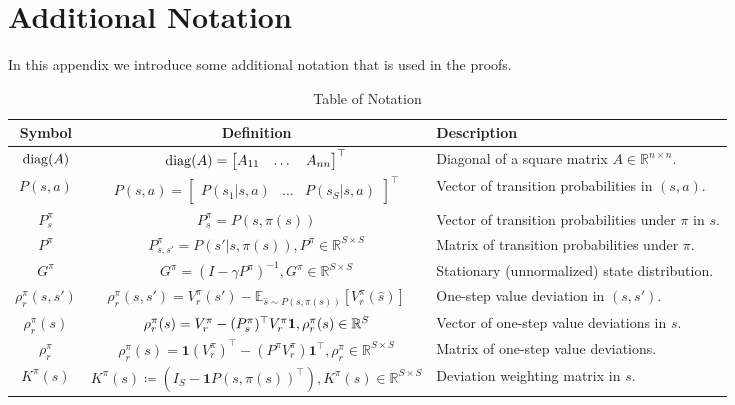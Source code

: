 \section{Additional Notation}
In this appendix we introduce some additional notation that is used in the proofs.
\renewcommand{\arraystretch}{1.25}
\begin{table}[H]
\centering
\caption{Table of Notation}
\label{tab:notation_table}
\begin{tabular}{|c|c|>{\raggedright\arraybackslash}p{7cm}|}
\hline
\textbf{Symbol} & \textbf{Definition} &\textbf{Description} \tabularnewline
\hline
${\rm diag}(A)$ & ${\rm diag}(A)=\begin{bmatrix} A_{11} & \dots & A_{nn}\end{bmatrix}^\top$ & Diagonal of a  square matrix $A\in \mathbb{R}^{n\times n}$. \tabularnewline \hline
$P(s,a)$ & $P(s,a)=\begin{bmatrix}P(s_1|s,a) &\dots & P(s_S|s,a)\end{bmatrix}^\top$ & Vector of transition probabilities in $(s,a)$. \tabularnewline \hline
$P_s^\pi$ & $P_s^\pi=P(s,\pi(s))$ & Vector of transition probabilities under $\pi$ in $s$. \tabularnewline \hline
$P^\pi$ & $P_{s,s'}^\pi=P(s'|s,\pi(s)), P^\pi \in \mathbb{R}^{S\times S}$ & Matrix of transition probabilities under $\pi$. \tabularnewline \hline
$G^\pi$ & $G^\pi=(I-\gamma P^\pi)^{-1}, G^\pi \in \mathbb{R}^{S\times S}$ & Stationary (unnormalized) state distribution. \tabularnewline \hline
$\rho_r^\pi(s,s')$ & $\rho_r^\pi(s,s')= V_r^\pi(s') - \mathbb{E}_{\hat s \sim P(s,\pi(s))}[V_r^\pi(\hat s)] $ & One-step value deviation in $(s,s')$.\tabularnewline \hline
$\rho_r^\pi(s)$ & $\rho_r^\pi(s) = V_{r}^\pi - (P_s^\pi)^\top V_r^\pi {\bf 1}, \rho_r^\pi(s)\in \mathbb{R}^S $ & Vector of one-step value deviations in $s$.\tabularnewline \hline
$\rho_r^\pi$ & $\rho_r^\pi(s) = \mathbf{1}(V_{r}^\pi)^\top - (P^\pi V_r^\pi)\mathbf{1}^\top, \rho_r^\pi\in \mathbb{R}^{S\times S} $ & Matrix of one-step value deviations.\tabularnewline \hline
$K^\pi(s)$ & $K^\pi(s)\coloneqq(I_S-\mathbf{1}P(s,\pi(s))^\top), K^\pi(s)\in \mathbb{R}^{S\times S}$ & Deviation weighting matrix in $s$.\tabularnewline \hline
\end{tabular}
\end{table}
\renewcommand{\arraystretch}{1}


